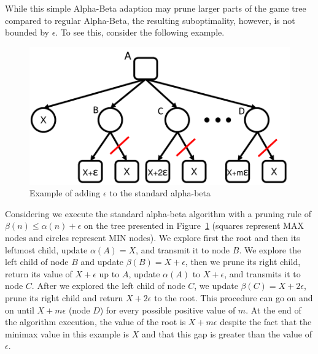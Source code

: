 \documentclass[runningheads]{llncs}
\begin{document}
While this simple Alpha-Beta adaption may prune larger parts of the game tree compared to regular Alpha-Beta, the resulting suboptimality, however, is not bounded by $\epsilon$.
To see this, consider the following example. 

\begin{figure}
	\centering
	\includegraphics[width=0.85\columnwidth]{Figures/example_e.pdf}
	\caption{Example of adding $\epsilon$ to the standard alpha-beta}
	\label{fig:example-e}
\end{figure}

Considering we execute the standard alpha-beta algorithm with a pruning rule of $\beta(n) \leq \alpha(n)+\epsilon$ on the tree presented in Figure~\ref{fig:example-e} (squares represent MAX nodes and circles represent MIN nodes).
We explore first the root and then its leftmost child, update $\alpha(A)=X$, and transmit it to node $B$.
We explore the left child of node $B$ and update $\beta(B)=X+\epsilon$, then we prune its right child, return its value of $X+\epsilon$ up to $A$, update $\alpha(A)$ to $X+\epsilon$, and transmits it to node $C$. 
After we explored the left child of node $C$, we update $\beta(C)=X+2\epsilon$, prune its right child and return $X+2\epsilon$ to the root.
This procedure can go on and on until $X+m\epsilon$ (node $D$) for every possible positive value of $m$.
At the end of the algorithm execution, the value of the root is $X+m\epsilon$ despite the fact that the minimax value in this example is $X$ and that this gap is greater than the value of $\epsilon$.

\end{document}
